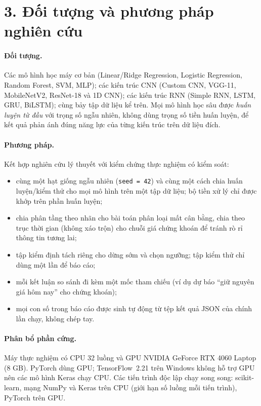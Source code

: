 \section*{3. Đối tượng và phương pháp nghiên cứu}

\paragraph{Đối tượng.} Các mô hình học máy cơ bản (Linear/Ridge Regression, Logistic Regression, Random Forest, SVM,
MLP); các kiến trúc CNN (Custom CNN, VGG-11, MobileNetV2, ResNet-18 và 1D CNN); các kiến trúc RNN (Simple RNN, LSTM,
GRU, BiLSTM); cùng bảy tập dữ liệu kể trên. Mọi mô hình học sâu được \emph{huấn luyện từ đầu} với trọng số ngẫu
nhiên, không dùng trọng số tiền huấn luyện, để kết quả phản ánh đúng năng lực của từng kiến trúc trên dữ liệu đích.

\paragraph{Phương pháp.} Kết hợp nghiên cứu lý thuyết với kiểm chứng thực nghiệm có kiểm soát:
\begin{itemize}
  \item cùng một hạt giống ngẫu nhiên (\texttt{seed = 42}) và cùng một cách chia huấn luyện/kiểm thử cho mọi mô hình
    trên một tập dữ liệu; bộ tiền xử lý chỉ được khớp trên phần huấn luyện;
  \item chia phân tầng theo nhãn cho bài toán phân loại mất cân bằng, chia theo trục thời gian (không xáo trộn) cho
    chuỗi giá chứng khoán để tránh rò rỉ thông tin tương lai;
  \item tập kiểm định tách riêng cho dừng sớm và chọn ngưỡng; tập kiểm thử chỉ dùng một lần để báo cáo;
  \item mỗi kết luận so sánh đi kèm một mốc tham chiếu (ví dụ dự báo “giữ nguyên giá hôm nay” cho chứng khoán);
  \item mọi con số trong báo cáo được sinh tự động từ tệp kết quả JSON của chính lần chạy, không chép tay.
\end{itemize}

\paragraph{Phân bổ phần cứng.} Máy thực nghiệm có CPU 32 luồng và GPU NVIDIA GeForce RTX 4060 Laptop (8 GB). PyTorch
dùng GPU; TensorFlow~2.21 trên Windows không hỗ trợ GPU nên các mô hình Keras chạy CPU. Các tiến trình độc lập chạy
song song: scikit-learn, mạng NumPy và Keras trên CPU (giới hạn số luồng mỗi tiến trình), PyTorch trên GPU.

